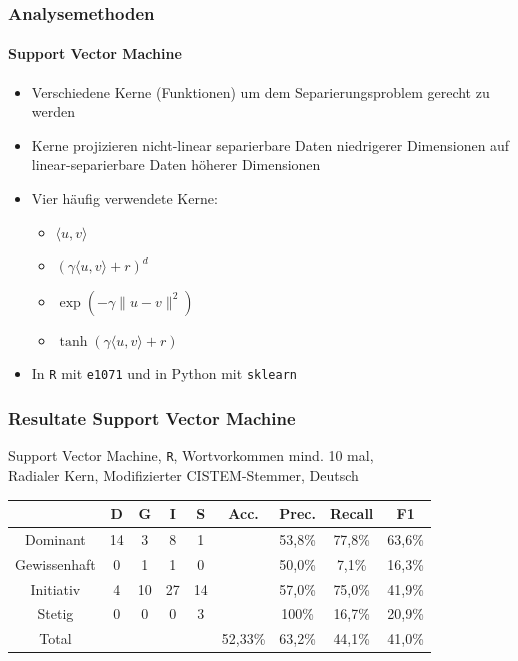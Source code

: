 \begin{frame}
\frametitle{Analysemethoden}
\framesubtitle{Support Vector Machine}
\begin{itemize}\setlength\parskip{12pt}
	\item Verschiedene Kerne (Funktionen) um dem Separierungsproblem gerecht zu werden
	\item Kerne projizieren nicht-linear separierbare Daten niedrigerer Dimensionen auf linear-separierbare Daten höherer Dimensionen
	\item Vier häufig verwendete Kerne:
	\begin{itemize}
		\item {} $\langle u, v \rangle$
		\item {} $(\gamma \langle u, v \rangle + r)^d$
		\item {} $\exp(-\gamma \| u-v \|^2)$
		\item {} $\tanh(\gamma \langle u,v \rangle + r)$
	\end{itemize}
	\item In \texttt{R} mit \texttt{e1071} und in Python mit \texttt{sklearn}
\end{itemize}
\end{frame}
\begin{frame}
\frametitle{Resultate Support Vector Machine}
\begin{center}
Support Vector Machine, \texttt{R}, Wortvorkommen mind. 10 mal,\\
Radialer Kern, Modifizierter CISTEM-Stemmer, Deutsch

\bigskip

\begin{tabular}{|c|c|c|c|c|c|c|c|c|}
\hline
				& D 	& G	& I & S	& Acc.	& Prec. & Recall	& F1\\
\hline
Dominant 		& 14		& 3 			& 8 		& 1 		&       	& 53,8\% 	& 77,8\% 	& 63,6\%\\
Gewissenhaft 	& 0 		& 1 			& 1 		& 0 		& 			& 50,0\% 	& 7,1\% 	& 16,3\%\\
Initiativ 		& 4 		& 10			& 27		& 14		& 			& 57,0\%		& 75,0\% 	& 41,9\%\\
Stetig 			& 0 		& 0 			& 0 		& 3 		& 			& 100\%	   	& 16,7\% 	& 20,9\%\\
\hline
Total 			& 			& 				& 			& 			& 52,33\%	& 63,2\%		& 44,1\%  	& 41,0\%\\
\hline
\end{tabular}
\end{center}
\end{frame}
